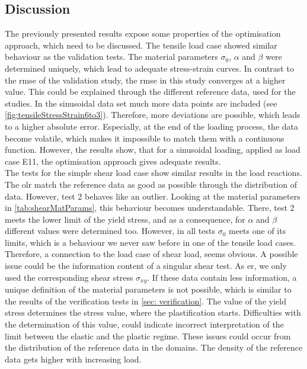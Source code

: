 \subsection{Discussion} \label{subsec:CombiDiscussion}
The previously presented results expose some properties of the optimisation approach, which need to be discussed. The tensile load case showed similar behaviour as the validation tests. The material parameters $\sigma_0$, $\alpha$ and $\beta$ were determined uniquely, which lead to adequate stress-strain curves. In contrast to the \acrshort{rmse} of the validation study, the \acrshort{rmse} in this study converges at a higher value. This could be explained through the different reference data, used for the studies. In the sinusoidal data set much more data points are included (see \autoref{fig:tensileStressStrain6to3}).
Therefore, more deviations are possible, which leads to a higher absolute error. Especially, at the end of the loading process, the data become volatile, which makes it impossible to match them with a continuous function. However, the results show, that for a sinusoidal loading, applied as load case E11, the optimisation approach gives adequate results. \\
The tests for the simple shear load case show similar results in the load reactions.
The \acrlong{olr} match the reference data as good as possible through the distribution of data.
However, test 2 behaves like an outlier. Looking at the material parameters in \autoref{tab:shearMatParams}, this behaviour becomes understandable. There, test 2 meets the lower limit of the yield stress, and as a consequence, for $\alpha$ and $\beta$ different values were determined too. However, in all tests $\sigma_0$ meets one of its limits, which is a behaviour we never saw before in one of the tensile load cases.
Therefore, a connection to the load case of shear load, seems obvious.
A possible issue could be the information content of a singular shear test. As \acrlong{er}, we only used the corresponding shear stress $\sigma_{xy}$. If these data contain less information, a unique definition of the material parameters is not possible, which is similar to the results of the verification tests in \autoref{sec: verification}. The value of the yield stress determines the stress value, where the plastification starts. Difficulties with the determination of this value, could indicate incorrect interpretation of the limit between the elastic and the plastic regime.
These issues could occur from the distribution of the reference data in the domains.
The density of the reference data gets higher with increasing load.
